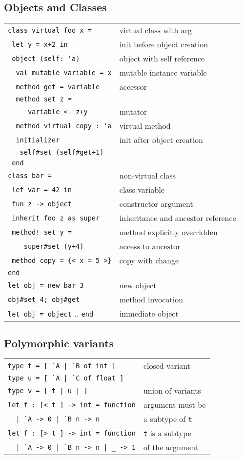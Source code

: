 \documentclass[10pt,landscape]{article}
\begin{document}
\begin{multicols}{3}
\subsection{Objects and Classes}

\begin{tabular}{ll}
\Verb!class virtual foo x = !& virtual class with arg \\
\Verb! let y = x+2 in! & init before object creation\\
\Verb! object (self: 'a)! & object with self reference\\
\Verb!  val mutable variable = x! & mutable instance variable \\
\Verb!  method get = variable! & accessor \\
\Verb!  method set z =!\\
\Verb!     variable <- z+y! & mutator\\
\Verb!  method virtual copy : 'a! & virtual method\\
\Verb!  initializer! & init after object creation\\
\Verb!   self#set (self#get+1)!& \\
\Verb! end! &  \\
\Verb!class bar = !&  non-virtual class\\
\Verb! let var = 42 in! & class variable\\
\Verb! fun z -> object! & constructor argument \\
\verb& inherit foo z as super& & inheritance and ancestor reference\\
\verb& method! set y =& & method explicitly overridden\\
\Verb!    super#set (y+4)! & access to ancestor \\
\Verb! method copy = {< x = 5 >}! & copy with change \\
\Verb!end! & \\
\Verb!let obj = new bar 3! & new object \\
\Verb!obj#set 4; obj#get!  & method invocation \\
\Verb!let obj = object! .. \Verb!end! & immediate object \
\end{tabular}

\subsection{Polymorphic variants}


\begin{tabular}{ll}
\Verb!type t = [ `A | `B of int ]! & closed variant \\
\Verb!type u = [ `A | `C of float ]! & \\
\Verb!type v = [ t | u | ]! & union of variants \\
\Verb!let f : [< t ] -> int = function! & argument must be\\
\Verb!  | `A -> 0 | `B n -> n! & \hfill a subtype of \Verb!t!\\
\Verb!let f : [> t ] -> int = function! & \Verb!t! is a subtype \\
\Verb!  | `A -> 0 | `B n -> n | _ -> 1! & \hfill of the argument \\
\end{tabular}

\end{multicols}
\end{document}
